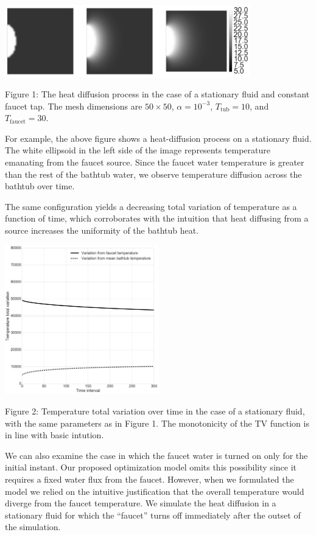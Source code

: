 \documentclass[12pt]{amsart}
\begin{document}
\begin{center}
\includegraphics[width=0.8\textwidth]{../plots/diffusion-01.png}

\justify
\footnotesize{
Figure 1: The heat diffusion process in the case of a stationary fluid and
constant faucet tap. The mesh
dimensions are $50 \times 50$, $\alpha = 10^{-3}$, $T_{\mathrm{tub}} = 10$, and
$T_{\mathrm{faucet}} = 30$.}
\end{center}

For example, the above figure shows a heat-diffusion process on a stationary
fluid. The white ellipsoid in the left side of the image represents temperature
emanating from the faucet source. Since the faucet water temperature is greater
than the rest of the bathtub water, we observe temperature diffusion across the
bathtub over time.

The same configuration yields a decreasing total variation of temperature as a function
of time, which corroborates with the intuition that heat diffusing from a source
increases the uniformity of the bathtub heat.

\begin{center}
    \includegraphics[width=0.5\textwidth]{../plots/tv-01.png}

    \justify
    \footnotesize{
    Figure 2: Temperature total variation over time in the case of a stationary
    fluid, with the same parameters as in Figure 1. The monotonicity of the TV
function is in line with basic intution.}
\end{center}

We can also examine the case in which the faucet water is turned on only for the
initial instant. Our proposed optimization model omits this possibility since it
requires a fixed water flux from the faucet. However, when we formulated the
model we relied on the intuitive justification that the overall temperature
would diverge from the faucet temperature. We simulate the heat diffusion in a
stationary fluid for which the ``faucet'' turns off immediately after the outset
of the simulation. 
\end{document}
